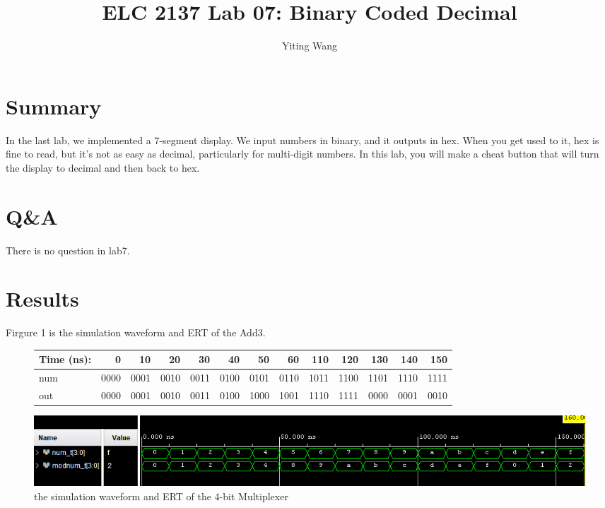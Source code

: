 \documentclass[11pt]{article}
\begin{document}
\title{ELC 2137 Lab 07: Binary Coded Decimal}
\author{Yiting Wang}

\maketitle


\section*{Summary}

In the last lab, we implemented a 7-segment display. We input numbers in binary, and it outputs in hex. When you get used to it, hex is fine to read, but it’s not as easy as decimal,  particularly for multi-digit numbers. In this lab, you will make a cheat button that will turn the display to decimal and then back to hex.  \\



\section*{Q\&A}

There is no question in lab7.\\



\section*{Results}

	Firgure 1 is the simulation waveform and ERT of the Add3.\\
	
	\begin{figure}[ht]\centering
		\begin{tabular}{l|rrrr|rrrr|rrrr}
			Time (ns): & 0 & 10 & 20 & 30 & 40 & 50 & 60 & 110 & 120 & 130 & 140 & 150 \\
			\midrule
			num & 0000 & 0001 & 0010 & 0011 & 0100 & 0101 & 0110 & 1011 & 1100 & 1101 & 1110 & 1111 \\
			\midrule
			out & 0000 & 0001 & 0010 & 0011 & 0100 & 1000 & 1001 & 1110 & 1111 & 0000 & 0001 & 0010 \\
			\bottomrule
		\end{tabular}\medskip
		
		\includegraphics[width=1\textwidth]{add3_simulate}
		\caption{the simulation waveform and ERT of the 4-bit Multiplexer}
		\label{fig:add3_simulate}
	\end{figure}
\end{document}
